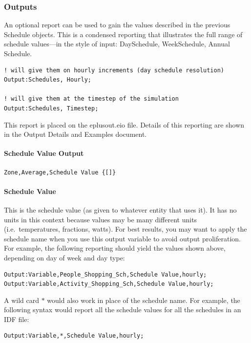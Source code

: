 \subsubsection{Outputs}\label{outputs-031}

An optional report can be used to gain the values described in the previous Schedule objects. This is a condensed reporting that illustrates the full range of schedule values---in the style of input: DaySchedule, WeekSchedule, Annual Schedule.

\begin{lstlisting}
! will give them on hourly increments (day schedule resolution)
Output:Schedules, Hourly;

! will give them at the timestep of the simulation
Output:Schedules, Timestep;
\end{lstlisting}

This report is placed on the eplusout.eio file. Details of this reporting are shown in the Output Details and Examples document.

\paragraph{Schedule Value Output}\label{schedule-value-output}

\begin{lstlisting}
Zone,Average,Schedule Value {[]}
\end{lstlisting}

\paragraph{Schedule Value}\label{schedule-value}

This is the schedule value (as given to whatever entity that uses it). It has no units in this context because values may be many different units (i.e.~temperatures, fractions, watts). For best results, you may want to apply the schedule name when you use this output variable to avoid output proliferation. For example, the following reporting should yield the values shown above, depending on day of week and day type:

\begin{lstlisting}
Output:Variable,People_Shopping_Sch,Schedule Value,hourly;
Output:Variable,Activity_Shopping_Sch,Schedule Value,hourly;
\end{lstlisting}

A wild card $*$ would also work in place of the schedule name. For example, the following syntax would report all the schedule values for all the schedules in an IDF file:
\begin{lstlisting}
Output:Variable,*,Schedule Value,hourly;
\end{lstlisting}

